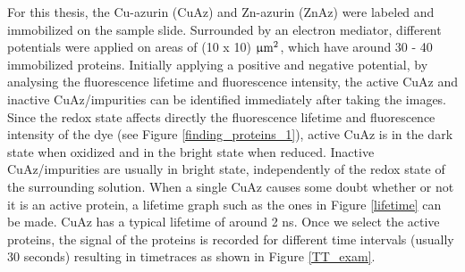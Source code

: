 \documentclass[twoside,single]{lion-msc}
\begin{document}
For this thesis, the Cu-azurin (CuAz) and Zn-azurin (ZnAz) were labeled and immobilized on the sample slide. Surrounded by an electron mediator, different potentials were applied on areas of (10 x 10) $\upmu \textup{m}^{2}$, which have around 30 - 40 immobilized proteins. Initially applying a positive and negative potential, by analysing the fluorescence lifetime and fluorescence intensity, the active CuAz and inactive CuAz/impurities can be identified immediately after taking the images. Since the redox state affects directly the fluorescence lifetime and fluorescence intensity of the dye (see Figure \ref{finding_proteins_1}),  active CuAz is in the dark state when oxidized and in the bright state when reduced. Inactive CuAz/impurities are usually in bright state, independently of the redox state of the surrounding solution. When a single CuAz causes some doubt whether or not it is an active protein, a lifetime graph such as the ones in Figure \ref{lifetime} can be made. CuAz has a typical lifetime of around 2 ns. 
Once we select the active proteins, the signal of the proteins is recorded for different time intervals (usually 30 seconds) resulting in timetraces as shown in Figure \ref{TT_exam}.
\end{document}
